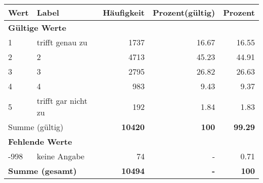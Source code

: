      \begin{longtable}{lXrrr}
     \toprule
     \textbf{Wert} & \textbf{Label} & \textbf{Häufigkeit} & \textbf{Prozent(gültig)} & \textbf{Prozent} \\
     \endhead
     \midrule
     \multicolumn{5}{l}{\textbf{Gültige Werte}}\\

     1 &
     \multicolumn{1}{X}{ trifft genau zu   } &


       \num{1737} &
       \num[round-mode=places,round-precision=2]{16.67} &
         \num[round-mode=places,round-precision=2]{16.55} \\

     2 &
     \multicolumn{1}{X}{ 2   } &


       \num{4713} &
       \num[round-mode=places,round-precision=2]{45.23} &
         \num[round-mode=places,round-precision=2]{44.91} \\

     3 &
     \multicolumn{1}{X}{ 3   } &


       \num{2795} &
       \num[round-mode=places,round-precision=2]{26.82} &
         \num[round-mode=places,round-precision=2]{26.63} \\

     4 &
     \multicolumn{1}{X}{ 4   } &


       \num{983} &
       \num[round-mode=places,round-precision=2]{9.43} &
         \num[round-mode=places,round-precision=2]{9.37} \\

     5 &
     \multicolumn{1}{X}{ trifft gar nicht zu   } &


       \num{192} &
       \num[round-mode=places,round-precision=2]{1.84} &
         \num[round-mode=places,round-precision=2]{1.83} \\
     \midrule
     \multicolumn{2}{l}{Summe (gültig)} &
       \textbf{\num{10420}} &
     \textbf{\num{100}} &
       \textbf{\num[round-mode=places,round-precision=2]{99.29}} \\
     \multicolumn{5}{l}{\textbf{Fehlende Werte}}\\
       -998 &
       keine Angabe &
         \num{74} &
        - &
         \num[round-mode=places,round-precision=2]{0.71} \\
     \midrule
     \multicolumn{2}{l}{\textbf{Summe (gesamt)}} &
          \textbf{\num{10494}} &
        \textbf{-} &
        \textbf{\num{100}} \\
     \bottomrule
     \end{longtable}
     
